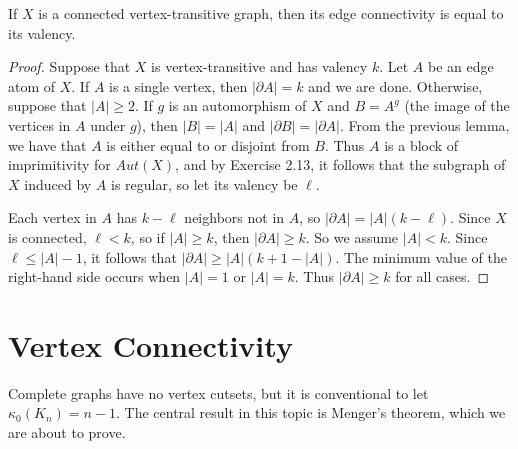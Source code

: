 \begin{lemma}
	If $X$ is a connected vertex-transitive graph, then its edge connectivity is equal to its valency.
\end{lemma}

\begin{proof}
	Suppose that $X$ is vertex-transitive and has valency $k$.  Let $A$ be an edge atom of $X$.  If $A$ is a single vertex, then $|\partial A|=k$ and we are done.  Otherwise, suppose that $|A|\geq 2$.  If $g$ is an automorphism of $X$ and $B=A^g$ (the image of the vertices in $A$ under $g$), then $|B|=|A|$ and $|\partial B|=|\partial A|$.  From the previous lemma, we have that $A$ is either equal to or disjoint from $B$. Thus $A$ is a block of imprimitivity for $Aut(X)$, and by Exercise 2.13, it follows that the subgraph of $X$ induced by $A$ is regular, so let its valency be $\ell$.
	
	Each vertex in $A$ has $k-\ell$ neighbors not in $A$, so $|\partial A|=|A|(k-\ell)$. Since $X$ is connected, $\ell<k$, so if $|A|\geq k$, then  $|\partial A|\geq k$.  So we assume $|A|<k$.  Since $\ell\leq |A|-1$, it follows that $|\partial A|\geq |A|(k+1-|A|)$.  The minimum value of the right-hand side occurs when $|A|=1$ or $|A|=k$.  Thus $|\partial A|\geq k$ for all cases.
\end{proof}

\section*{Vertex Connectivity}



Complete graphs have no vertex cutsets, but it is conventional to let $\kappa_0(K_n)=n-1$.  The central result in this topic is Menger's theorem, which we are about to prove.





